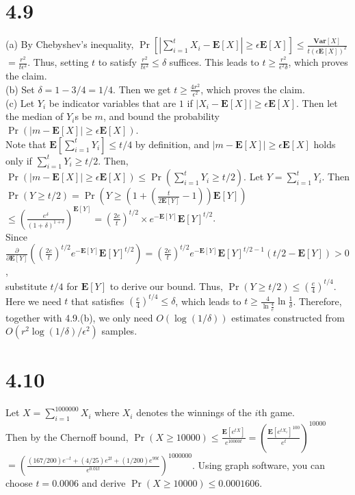 \documentclass{article}
\begin{document}
\section*{4.9}
(a) By Chebyshev's inequality, $\Pr[|\sum\limits_{i=1}^tX_i-\textbf{E}[X]|\geq\epsilon\textbf{E}[X]]\leq\frac{\textbf{Var}[X]}{t(\epsilon\textbf{E}[X])^2}$
$=\frac{r^2}{t\epsilon^2}$. Thus, setting $t$ to satisfy $\frac{r^2}{t\epsilon^2}\leq \delta$ suffices.
This leads to $t \geq \frac{r^2}{\epsilon^2\delta}$, which proves the claim.\\
(b) Set $\delta=1-3/4=1/4$. Then we get $t \geq \frac{4r^2}{\epsilon^2}$, which proves the claim.\\
(c) Let $Y_i$ be indicator variables that are $1$ if $|X_i-\textbf{E}[X]|\geq\epsilon\textbf{E}[X]$. Then let the median of $Y_i$s be $m$, and bound the probability $\Pr(|m-\textbf{E}[X]|\geq\epsilon\textbf{E}[X])$.\\
Note that $\textbf{E}[\sum\limits_{i=1}^tY_i]\leq t/4$ by definition, and $|m-\textbf{E}[X]|\geq\epsilon\textbf{E}[X]$ holds only if $\sum\limits_{i=1}^tY_i \geq t/2$.
Then, $\Pr(|m-\textbf{E}[X]|\geq\epsilon\textbf{E}[X]) \leq \Pr\left(\sum\limits_{i=1}^tY_i \geq t/2\right)$. Let $Y=\sum\limits_{i=1}^tY_i$.
Then $\Pr(Y\geq t/2)=\Pr\left(Y\geq(1+(\frac{t}{2\textbf{E}[Y]}-1))\textbf{E}[Y]\right)$\\
$\leq \left(\frac{e^\delta}{(1+\delta)^{1+\delta}}\right)^{\textbf{E}[Y]}=(\frac{2e}{t})^{t/2}\times e^{-\textbf{E}[Y]}\textbf{E}[Y]^{t/2}$.\\
Since $\frac{\partial}{\partial \textbf{E}[Y]}\left( (\frac{2e}{t})^{t/2}e^{-\textbf{E}[Y]}\textbf{E}[Y]^{t/2} \right)=(\frac{2e}{t})^{t/2} e^{-\textbf{E}[Y]}\textbf{E}[Y]^{t/2-1}(t/2-\textbf{E}[Y])> 0$,\\
substitute $t/4$ for $\textbf{E}[Y]$ to derive our bound. Thus, $\Pr(Y\geq t/2) \leq (\frac{e}{4})^{t/4}$.\\
Here we need $t$ that satisfies $(\frac{e}{4})^{t/4} \leq \delta$, which leads to $t \geq \frac{4}{\ln \frac{4}{e}}\ln \frac{1}{\delta}$.
Therefore, together with 4.9.(b), we only need $O(\log(1/\delta))$ estimates constructed from $O(r^2\log(1/\delta)/\epsilon^2)$ samples.
\section*{4.10}
Let $X=\sum\limits_{i=1}^{1000000}X_i$ where $X_i$ denotes the winnings of the $i$th game.\\
Then by the Chernoff bound, $\Pr(X\geq10000) \leq \frac{\textbf{E}[e^{tX}]}{e^{10000t}}=\left(\frac{\textbf{E}[e^{tX_i}]^{100}}{e^{t}}\right)^{10000}$\\
$=\left(\frac{(167/200)e^{-t}+(4/25)e^{2t}+(1/200)e^{99t}}{e^{0.01t}}\right)^{1000000}$.
Using graph software, you can choose $t=0.0006$ and derive $\Pr(X\geq10000) \leq 0.0001606$.
\end{document}

